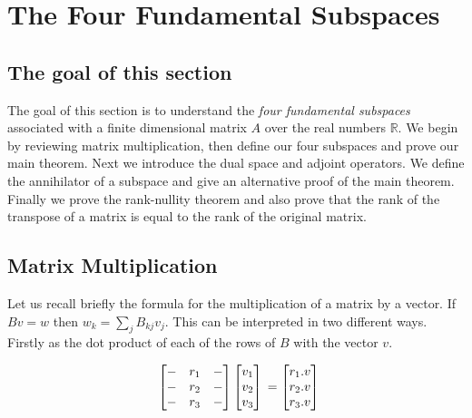 \chapter{The Four Fundamental Subspaces}

\Large

\section{The goal of this section}

The goal of this section is to understand the \emph{four fundamental subspaces} associated with a finite dimensional matrix $A$ over the real numbers $\mathbb{R}$. We begin by reviewing matrix multiplication, then define our four subspaces and prove our main theorem. Next we introduce the dual space and adjoint operators. We define the annihilator of a subspace and give an alternative proof of the main theorem. Finally we prove the rank-nullity theorem and also prove that the rank of the transpose of a matrix is equal to the rank of the original matrix.

\section{Matrix Multiplication}

Let us recall briefly the formula for the multiplication of a matrix by a vector. If $B v = w$ then $w_k = \sum_j B_{kj} v_j$. This can be interpreted in two different ways. Firstly as the dot product of each of the rows of $B$ with the vector $v$.


\[
\begin{array}{c@{\,}c}
\begin{bmatrix}
- & r_1 & - \\
- & r_2 & - \\
- & r_3 & - \\
\end{bmatrix}
\begin{bmatrix}
v_1 \\
v_2 \\
v_3 \\
\end{bmatrix}
\end{array}
=
\begin{bmatrix}
r_1 . v \\
r_2 . v \\
r_3 . v \\
\end{bmatrix}
\]

